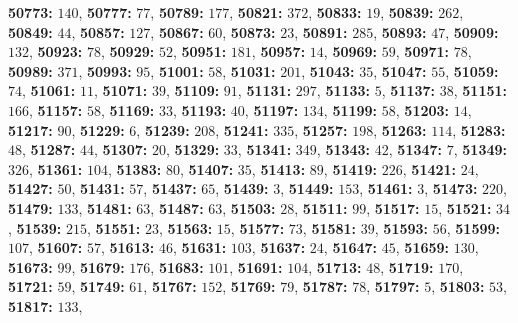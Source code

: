 \textsf{\bfseries 50773:} $140$, \textsf{\bfseries 50777:} $77$, \textsf{\bfseries 50789:} $177$, \textsf{\bfseries 50821:} $372$, \textsf{\bfseries 50833:} $19$, \textsf{\bfseries 50839:} $262$, \textsf{\bfseries 50849:} $44$, \textsf{\bfseries 50857:} $127$, \textsf{\bfseries 50867:} $60$, \textsf{\bfseries 50873:} $23$, \textsf{\bfseries 50891:} $285$, \textsf{\bfseries 50893:} $47$, \textsf{\bfseries 50909:} $132$, \textsf{\bfseries 50923:} $78$, \textsf{\bfseries 50929:} $52$, \textsf{\bfseries 50951:} $181$, \textsf{\bfseries 50957:} $14$, \textsf{\bfseries 50969:} $59$, \textsf{\bfseries 50971:} $78$, \textsf{\bfseries 50989:} $371$, \textsf{\bfseries 50993:} $95$, \textsf{\bfseries 51001:} $58$, \textsf{\bfseries 51031:} $201$, \textsf{\bfseries 51043:} $35$, \textsf{\bfseries 51047:} $55$, \textsf{\bfseries 51059:} $74$, \textsf{\bfseries 51061:} $11$, \textsf{\bfseries 51071:} $39$, \textsf{\bfseries 51109:} $91$, \textsf{\bfseries 51131:} $297$, \textsf{\bfseries 51133:} $5$, \textsf{\bfseries 51137:} $38$, \textsf{\bfseries 51151:} $166$, \textsf{\bfseries 51157:} $58$, \textsf{\bfseries 51169:} $33$, \textsf{\bfseries 51193:} $40$, \textsf{\bfseries 51197:} $134$, \textsf{\bfseries 51199:} $58$, \textsf{\bfseries 51203:} $14$, \textsf{\bfseries 51217:} $90$, \textsf{\bfseries 51229:} $6$, \textsf{\bfseries 51239:} $208$, \textsf{\bfseries 51241:} $335$, \textsf{\bfseries 51257:} $198$, \textsf{\bfseries 51263:} $114$, \textsf{\bfseries 51283:} $48$, \textsf{\bfseries 51287:} $44$, \textsf{\bfseries 51307:} $20$, \textsf{\bfseries 51329:} $33$, \textsf{\bfseries 51341:} $349$, \textsf{\bfseries 51343:} $42$, \textsf{\bfseries 51347:} $7$, \textsf{\bfseries 51349:} $326$, \textsf{\bfseries 51361:} $104$, \textsf{\bfseries 51383:} $80$, \textsf{\bfseries 51407:} $35$, \textsf{\bfseries 51413:} $89$, \textsf{\bfseries 51419:} $226$, \textsf{\bfseries 51421:} $24$, \textsf{\bfseries 51427:} $50$, \textsf{\bfseries 51431:} $57$, \textsf{\bfseries 51437:} $65$, \textsf{\bfseries 51439:} $3$, \textsf{\bfseries 51449:} $153$, \textsf{\bfseries 51461:} $3$, \textsf{\bfseries 51473:} $220$, \textsf{\bfseries 51479:} $133$, \textsf{\bfseries 51481:} $63$, \textsf{\bfseries 51487:} $63$, \textsf{\bfseries 51503:} $28$, \textsf{\bfseries 51511:} $99$, \textsf{\bfseries 51517:} $15$, \textsf{\bfseries 51521:} $34$, \textsf{\bfseries 51539:} $215$, \textsf{\bfseries 51551:} $23$, \textsf{\bfseries 51563:} $15$, \textsf{\bfseries 51577:} $73$, \textsf{\bfseries 51581:} $39$, \textsf{\bfseries 51593:} $56$, \textsf{\bfseries 51599:} $107$, \textsf{\bfseries 51607:} $57$, \textsf{\bfseries 51613:} $46$, \textsf{\bfseries 51631:} $103$, \textsf{\bfseries 51637:} $24$, \textsf{\bfseries 51647:} $45$, \textsf{\bfseries 51659:} $130$, \textsf{\bfseries 51673:} $99$, \textsf{\bfseries 51679:} $176$, \textsf{\bfseries 51683:} $101$, \textsf{\bfseries 51691:} $104$, \textsf{\bfseries 51713:} $48$, \textsf{\bfseries 51719:} $170$, \textsf{\bfseries 51721:} $59$, \textsf{\bfseries 51749:} $61$, \textsf{\bfseries 51767:} $152$, \textsf{\bfseries 51769:} $79$, \textsf{\bfseries 51787:} $78$, \textsf{\bfseries 51797:} $5$, \textsf{\bfseries 51803:} $53$, \textsf{\bfseries 51817:} $133$, 

